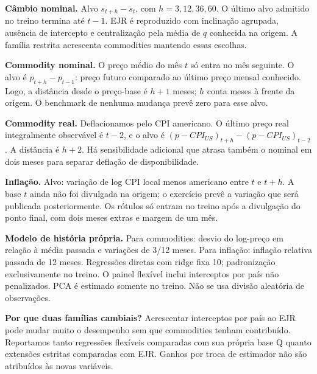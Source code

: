 \documentclass[11pt,a4paper]{article}
\begin{document}
\textbf{Câmbio nominal.} Alvo $s_{t+h}-s_t$, com $h=3,12,36,60$. O último alvo admitido no treino termina até $t-1$. EJR é reproduzido com inclinação agrupada, ausência de intercepto e centralização pela média de $q$ conhecida na origem. A família restrita acrescenta commodities mantendo essas escolhas.

\textbf{Commodity nominal.} O preço médio do mês $t$ só entra no mês seguinte. O alvo é $p_{t+h}-p_{t-1}$: preço futuro comparado ao último preço mensal conhecido. Logo, a distância desde o preço-base é $h+1$ meses; $h$ conta meses à frente da origem. O benchmark de nenhuma mudança prevê zero para esse alvo.

\textbf{Commodity real.} Deflacionamos pelo CPI americano. O último preço real integralmente observável é $t-2$, e o alvo é $(p-CPI_{US})_{t+h}-(p-CPI_{US})_{t-2}$. A distância é $h+2$. Há sensibilidade adicional que atrasa também o nominal em dois meses para separar deflação de disponibilidade.

\textbf{Inflação.} Alvo: variação de log CPI local menos americano entre $t$ e $t+h$. A base $t$ ainda não foi divulgada na origem; o exercício prevê a variação que será publicada posteriormente. Os rótulos só entram no treino após a divulgação do ponto final, com dois meses extras e margem de um mês.

\textbf{Modelo de história própria.} Para commodities: desvio do log-preço em relação à média passada e variações de 3/12 meses. Para inflação: inflação relativa passada de 12 meses. Regressões diretas com ridge fixa 10; padronização exclusivamente no treino. O painel flexível inclui interceptos por país não penalizados. PCA é estimado somente no treino. Não se usa divisão aleatória de observações.

\textbf{Por que duas famílias cambiais?} Acrescentar interceptos por país ao EJR pode mudar muito o desempenho sem que commodities tenham contribuído. Reportamos tanto regressões flexíveis comparadas com sua própria base Q quanto extensões estritas comparadas com EJR. Ganhos por troca de estimador não são atribuídos às novas variáveis.

\clearpage
\end{document}
